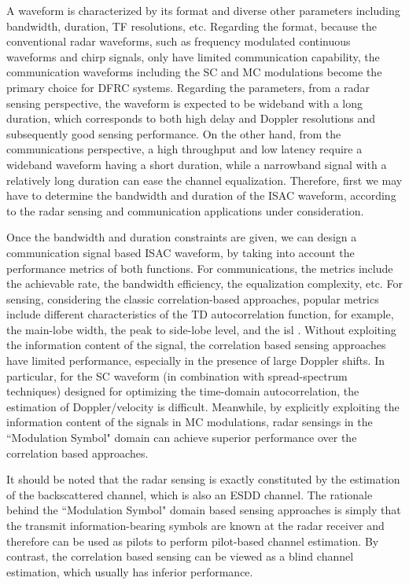 \documentclass[journal]{IEEEtran}
\begin{document}
{A waveform is characterized by its format and diverse other parameters including bandwidth, duration, TF resolutions, etc. Regarding the format,
because the conventional radar waveforms, such as frequency modulated continuous waveforms and chirp signals, only have limited communication capability\cite{ma2020}, the communication waveforms including the SC and MC modulations become the primary choice for DFRC systems\cite{sturm2011,paul2017,ma2020}. Regarding the parameters, from a radar sensing perspective, the waveform is expected to {be wideband with a long duration, which corresponds} to both high delay and Doppler resolutions and subsequently  good sensing performance. On the other hand, from the communications perspective, a high throughput and low latency require a wideband waveform having a short duration, while a narrowband signal with a relatively long duration can ease the channel equalization.
Therefore, first we may have to determine the {bandwidth and duration of the ISAC waveform}, according to the {radar sensing and communication applications under consideration}.


Once the bandwidth and duration constraints are given, we can design a communication signal based ISAC waveform, by taking into account the performance metrics of both functions. For communications, the metrics include the achievable rate, the bandwidth efficiency, the equalization complexity, etc.
For sensing, considering the classic correlation-based approaches, popular metrics include different characteristics of the TD autocorrelation function, for example, the main-lobe width, the peak to side-lobe level, and the \ac{isl} \cite{guo_radarcon_2014}. Without exploiting the {information content of the signal}, the correlation based sensing approaches have limited performance, especially in the presence of large Doppler shifts\cite{sturm2011}. In particular, for the SC waveform (in combination with spread-spectrum techniques) designed for optimizing the time-domain autocorrelation, the estimation of Doppler/velocity is difficult\cite{sturm2011}. Meanwhile, by explicitly exploiting the {information content of the signals in MC modulations}, {radar sensings} in the ``Modulation Symbol" domain \cite{berger_jstsp_2010,sturm2011} can achieve superior performance over the correlation based approaches.

It should be noted that the radar sensing is exactly constituted by the estimation of the backscattered channel\cite{paul2017}, which is also an ESDD channel.
The rationale behind the ``Modulation Symbol" domain based sensing approaches is simply that the transmit information-bearing symbols are known at the radar receiver and therefore can be used as pilots to perform pilot-based channel estimation. By contrast, the correlation based sensing can be viewed as a blind channel estimation, which usually has inferior performance.


}
\end{document}

